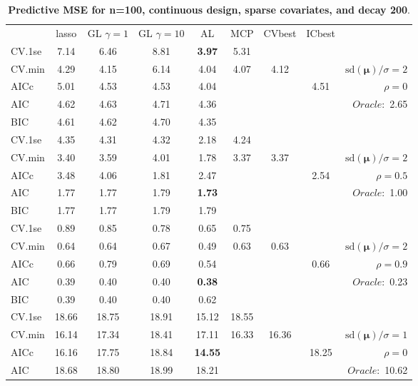 \begin{table}\vspace{-.5cm}
\caption[l]{ { \bf Predictive MSE for n=100, continuous design, 
sparse covariates, and  decay  200}.}
\vspace{-.5cm}
\footnotesize{}
\begin{center}
\begin{tabular}{l*{7}{c}|r}
 & lasso & GL $\gamma=1$ & GL $\gamma=10$ & AL & MCP  & CVbest & ICbest  \\
\cline{1-9}
CV.1se & 7.14 & 6.46 & 8.81 & {\bf 3.97} & 5.31 & & & \\
CV.min & 4.29 & 4.15 & 6.14 & 4.04 & 4.07 & 4.12 & & $\mathrm{sd}(\mathbf{\mu})/\sigma=2$ \\
AICc & 5.01 & 4.53 & 4.53 & 4.04 & & & 4.51 &  $\rho=0$ \\
AIC & 4.62 & 4.63 & 4.71 & 4.36 & & & &  \multirow{2}{*}{$Oracle: $ 2.65} \\
BIC & 4.61 & 4.62 & 4.70 & 4.35 & & & &  \\
 \hline 
CV.1se & 4.35 & 4.31 & 4.32 & 2.18 & 4.24 & & & \\
CV.min & 3.40 & 3.59 & 4.01 & 1.78 & 3.37 & 3.37 & & $\mathrm{sd}(\mathbf{\mu})/\sigma=2$ \\
AICc & 3.48 & 4.06 & 1.81 & 2.47 & & & 2.54 &  $\rho=0.5$ \\
AIC & 1.77 & 1.77 & 1.79 & {\bf 1.73} & & & &  \multirow{2}{*}{$Oracle: $ 1.00} \\
BIC & 1.77 & 1.77 & 1.79 & 1.79 & & & &  \\
 \hline 
CV.1se & 0.89 & 0.85 & 0.78 & 0.65 & 0.75 & & & \\
CV.min & 0.64 & 0.64 & 0.67 & 0.49 & 0.63 & 0.63 & & $\mathrm{sd}(\mathbf{\mu})/\sigma=2$ \\
AICc & 0.66 & 0.79 & 0.69 & 0.54 & & & 0.66 &  $\rho=0.9$ \\
AIC & 0.39 & 0.40 & 0.40 & {\bf 0.38} & & & &  \multirow{2}{*}{$Oracle: $ 0.23} \\
BIC & 0.39 & 0.40 & 0.40 & 0.62 & & & &  \\
 \hline 
CV.1se & 18.66 & 18.75 & 18.91 & 15.12 & 18.55 & & & \\
CV.min & 16.14 & 17.34 & 18.41 & 17.11 & 16.33 & 16.36 & & $\mathrm{sd}(\mathbf{\mu})/\sigma=1$ \\
AICc & 16.16 & 17.75 & 18.84 & {\bf 14.55} & & & 18.25 &  $\rho=0$ \\
AIC & 18.68 & 18.80 & 18.99 & 18.21 & & & &  \multirow{2}{*}{$Oracle: $ 10.62} \\

\end{tabular}
\end{center}
\end{table}
